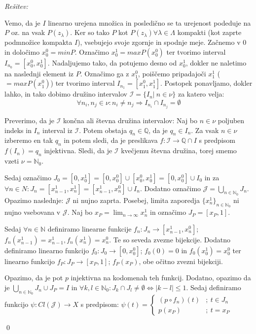\documentclass[a4paper, 10pt]{article}
\newenvironment{Rešitev}{\begin{flushleft}\textit{Rešitev:}}{\hfill\qed\end{flushleft}}
\newcommand{\abs}[1]{\ensuremath{\lvert #1 \rvert}}
\newcommand{\mth}[1]{\ensuremath{\mathbb{#1}}}
\newcommand{\N}{\mth{N}}
\newcommand{\No}{\mth{N}_0}
\newcommand{\Q}{\mth{Q}}
\newcommand{\map}[3]{\ensuremath{{#1}: {#2} \rightarrow {#3}}}
\begin{document}
\begin{Rešitev}
\begin{itemize}
			Vemo, da je $I$ linearno urejena množica in posledično se ta urejenost podeduje na $P$ oz. na vsak $P(z_\lambda)$. Ker so tako $P$ kot $P(z_\lambda) \forall \lambda \in \Lambda$ kompakti (kot zaprte podmnožice kompakta $I$), vsebujejo svoje zgornje in spodnje meje. Začnemo v $0$ in določimo $x_0^0 = minP$. Označimo $x_0^1 = maxP(x_0^0)$ ter tvorimo interval $I_{n_0} = [x_0^0, x_0^1]$. Nadaljujemo tako, da potujemo desno od $x_0^1$, dokler ne naletimo na naslednji element iz $P$. Označimo ga z $x_1^0$, poiščemo pripadajoči $x_1^1$ ($=maxP(x_1^0)$) ter tvorimo interval $I_{n_1} = [x_1^0, x_1^1]$. Postopek ponavljamo, dokler lahko, in tako dobimo družino intervalov $\mathcal{I} = \{I_n |~ n\in \nu\}$ za katero velja:
				$$\forall n_i, n_j \in \nu: n_i \neq n_j \Rightarrow I_{n_i}\cap I_{n_j} = \emptyset$$
			
			Preverimo, da je $\mathcal{I}$ končna ali števna družina intervalov: Naj bo $n\in \nu$ poljuben indeks in $I_n$ interval iz $\mathcal{I}$. Potem obstaja $q_n \in \Q$, da je $q_n\in I_n$. Za vsak $n\in \nu$ izberemo en tak $q_n$ in potem sledi, da je preslikava $\map{f}{\mathcal{I}}{\Q\cap I}$ s predpisom $f(I_n) = q_n$ injektivna. Sledi, da je $\mathcal{I}$ kvečjemu števna družina, torej smemo vzeti $\nu = \No$.
			
			Sedaj označimo $J_0 = [0, x_0^1] = [0, x_0^0]\cup [x_0^0, x_0^1] = [0, x_0^0]\cup I_0$ in za $\forall n \in N: J_n = [x_{n-1}^1, x_n^1] = [x_{n-1}^1, x_n^0] \cup I_n$. Dodatno označimo $\mathcal{J}=\bigcup_{n\in \No}J_n$. Opazimo naslednje: $\mathcal{J}$ ni nujno zaprta. Posebej, limita zaporedja $\{x_n^1\}_{n\in\No}$ ni nujno vsebovana v $\mathcal{J}$. Naj bo $x_P = \lim_{n\to\infty}x_n^1$ in označimo $J_P = [x_P, 1]$.
			
			 Sedaj $\forall n\in\N$ definiramo linearne funkcije $\map{f_n}{J_n}{[x_{n-1}^1, x_n^0]}$; $f_n(x_{n-1}^1) = x_{n-1}^1, f_n(x_n^1) = x_n^0$. Te so seveda zvezne bijekcije. Dodatno definiramo linearno funkcijo $\map{f_0}{J_0}{[0, x_0^0]}$; $f_0(0) = 0$ in $f_0(x_0^1) = x_0^0$ ter linearno funkcijo $\map{f_P}{J_P}{[x_P, 1]}$; $f_P(x_P)$, obe očitno zvezni bijekciji.
			 
			  Opazimo, da je pot $p$ injektivna na kodomenah teh funkcij. Dodatno, opazimo da je $\bigcup_{n\in \No} J_n \cup J_P = I$ in $\forall k, l\in \No: J_k\cap J_l \neq \emptyset \iff \abs{k - l} \leq 1$. Sedaj definiramo funkcijo $\map{\psi}{Cl(\mathcal{J})}{X}$ s predpisom: $\psi(t) = \begin{cases}
				(p \circ f_n)(t)&;~t\in J_n \\
				p(x_P) &;~ t = x_P
			\end{cases}$
			

\end{itemize}
\end{Rešitev}
\end{document}

